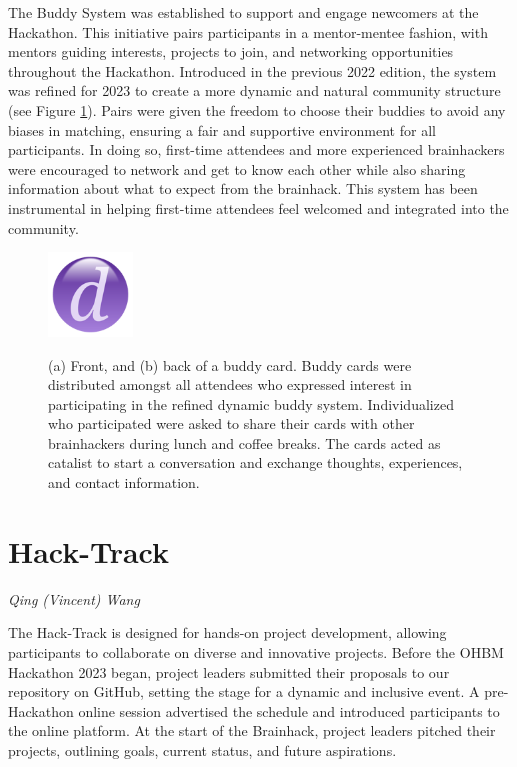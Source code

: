 \documentclass{article}
\newcommand\coordinator[1]{\begin{flushleft}\small\textit{#1}\end{flushleft}}
\begin{document}
The Buddy System was established to support and engage newcomers at the Hackathon.
This initiative pairs participants in a mentor-mentee fashion, with mentors guiding interests, projects to join, and networking opportunities throughout the Hackathon.
Introduced in the previous 2022 edition, the system was refined for 2023 to create a more dynamic and natural community structure (see Figure \ref{fig:buddy-system}).
Pairs were given the freedom to choose their buddies to avoid any biases in matching, ensuring a fair and supportive environment for all participants.
In doing so, first-time attendees and more experienced brainhackers were encouraged to network and get to know each other while also sharing information about what to expect from the brainhack.
This system has been instrumental in helping first-time attendees feel welcomed and integrated into the community.

\begin{figure}[h]
    \centering
    \includegraphics[width=0.2\textwidth]{images/placeholder.png}
    \label{fig:buddy-system}
    \caption{
        (a) Front, and (b) back of a buddy card.
        Buddy cards were distributed amongst all attendees who expressed interest in participating in the refined dynamic buddy system.
        Individualized who participated were asked to share their cards with other brainhackers during lunch and coffee breaks.
        The cards acted as catalist to start a conversation and exchange thoughts, experiences, and contact information.
    }
\end{figure}

\section{Hack-Track}
\coordinator{Qing (Vincent) Wang}

The Hack-Track is designed for hands-on project development, allowing participants to collaborate on diverse and innovative projects.
Before the OHBM Hackathon 2023 began, project leaders submitted their proposals to our repository on GitHub, setting the stage for a dynamic and inclusive event.
A pre-Hackathon online session advertised the schedule and introduced participants to the online platform.
At the start of the Brainhack, project leaders pitched their projects, outlining goals, current status, and future aspirations.
\end{document}
